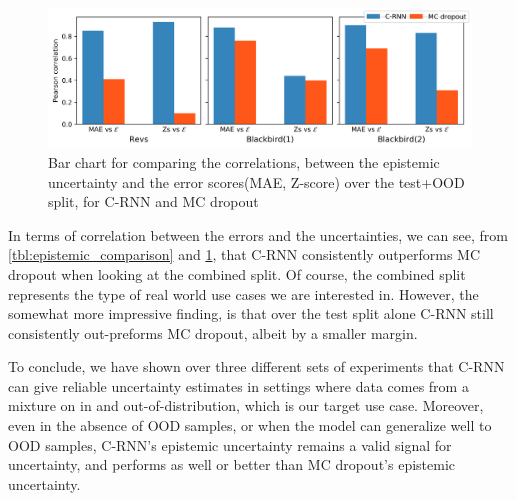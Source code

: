 \documentclass[../main.tex]{subfiles}
\begin{document}
\begin{figure}[htbp]
  \centering
    \includegraphics[width=\textwidth]{Experiments/figs/correlation_comparison.png}

    \caption[Comparison of error-uncertainty correlations for C-RNN and MC dropout]{Bar chart for comparing the correlations, between the epistemic uncertainty and the error scores(MAE, Z-score) over the test+OOD split, for C-RNN and MC dropout}
    \label{fig:epistmic_comparison}
\end{figure}


In terms of correlation between the errors and the uncertainties, we can see, from \cref{tbl:epistemic_comparison} and \cref{fig:epistmic_comparison}, that C-RNN consistently outperforms MC dropout when looking at the combined split. Of course, the combined split represents the type of real world use cases we are interested in. However, the somewhat more impressive finding, is that over the test split alone C-RNN still consistently out-preforms MC dropout, albeit by a smaller margin.  

To conclude, we have shown over three different sets of experiments that C-RNN can give reliable uncertainty estimates in settings where data comes from a mixture on in and out-of-distribution, which is our target use case. Moreover, even in the absence of OOD samples, or when the model can generalize well to OOD samples, C-RNN's epistemic uncertainty remains a valid signal for uncertainty, and performs as well or better than MC dropout's epistemic uncertainty. 

\end{document}
